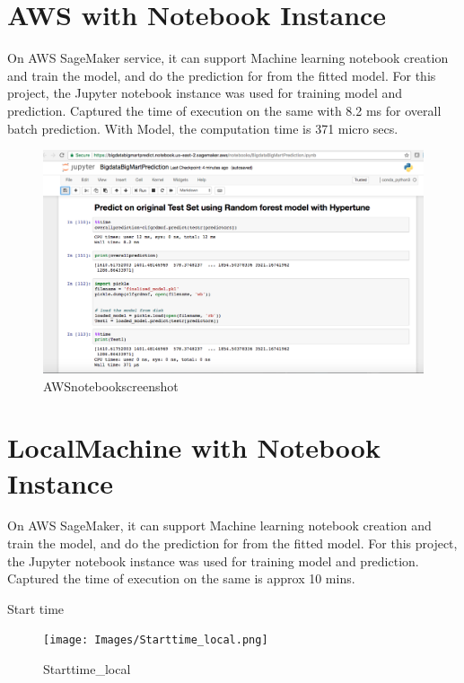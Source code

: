 \section{AWS with Notebook Instance}

On AWS SageMaker service, it can support Machine learning notebook creation 
and train the model, and do the prediction for from the fitted model. For this 
project, the Jupyter notebook instance was used for training model and 
prediction. Captured the time of execution on the same with 8.2 ms for overall 
batch prediction. With Model, the computation time is 371 micro secs.

\begin{figure}[pic10]
	\centering\includegraphics[width=\columnwidth]
{Images/AWSnotebookscreenshot.png}
	\caption{AWSnotebookscreenshot}
\label{fig:AWSnotebookscreenshot}
\end{figure}

\section{LocalMachine with Notebook Instance}

On AWS SageMaker, it can support Machine learning notebook creation and 
train the model, and do the prediction for from the fitted model. For this 
project, the Jupyter notebook instance was used for training model and 
prediction. Captured the time of execution on the same is approx 10 mins.

Start time
\begin{figure}[pic11]
	\centering\texttt{[image: Images/Starttime\_local.png]}
	\caption{Starttime_local}\label{fig:Starttime_local}
\end{figure}

